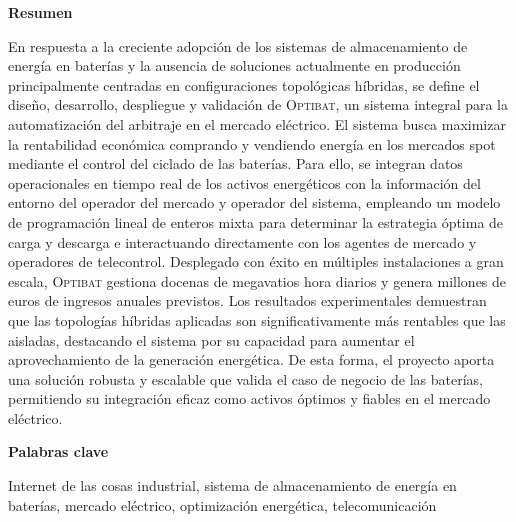 \newpage

\thispagestyle{empty}

\begin{center}
  {\bf \huge Resumen}
\end{center}

\vspace{1cm}

En respuesta a la creciente adopción de los sistemas de almacenamiento de energía en baterías y la ausencia de soluciones actualmente en producción principalmente centradas en configuraciones topológicas híbridas, se define el diseño, desarrollo, despliegue y validación de \textsc{Optibat}, un sistema integral para la automatización del arbitraje en el mercado eléctrico. El sistema busca maximizar la rentabilidad económica comprando y vendiendo energía en los mercados spot mediante el control del ciclado de las baterías. Para ello, se integran datos operacionales en tiempo real de los activos energéticos con la información del entorno del operador del mercado y operador del sistema, empleando un modelo de programación lineal de enteros mixta para determinar la estrategia óptima de carga y descarga e interactuando directamente con los agentes de mercado y operadores de telecontrol. Desplegado con éxito en múltiples instalaciones a gran escala, \textsc{Optibat} gestiona docenas de megavatios hora diarios y genera millones de euros de ingresos anuales previstos. Los resultados experimentales demuestran que las topologías híbridas aplicadas son significativamente más rentables que las aisladas, destacando el sistema por su capacidad para aumentar el aprovechamiento de la generación energética. De esta forma, el proyecto aporta una solución robusta y escalable que valida el caso de negocio de las baterías, permitiendo su integración eficaz como activos óptimos y fiables en el mercado eléctrico.

\vspace{1cm}

\begin{center}
  {\bf \large Palabras clave}
\end{center}

\vspace{0.5cm}

Internet de las cosas industrial, sistema de almacenamiento de energía en baterías, mercado eléctrico, optimización energética, telecomunicación

\newpage

\thispagestyle{empty}


